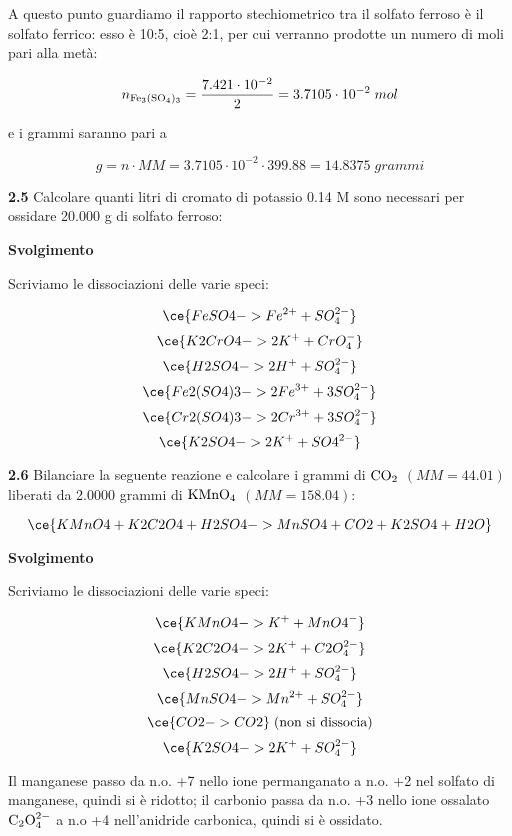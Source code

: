 A questo punto guardiamo il rapporto stechiometrico tra il solfato ferroso è il solfato ferrico: esso è 10:5, cioè 2:1, per cui verranno prodotte un numero di moli pari alla metà:

$$n_{\rm Fe_3(SO_4)_3}=\frac{7.421 \cdot 10^{-2}}{2}=3.7105 \cdot 10^{-2}\;mol$$

e i grammi saranno pari a 

$$g=n \cdot MM=3.7105 \cdot 10^{-2} \cdot 399.88=14.8375\;grammi$$

\vspace{0.2cm}\textbf{2.5} Calcolare quanti litri di cromato di potassio 0.14 M sono necessari per ossidare 20.000 g di solfato ferroso:
\begin{center}

\end{center}

\large\textbf{Svolgimento}\normalsize

\vspace{0.2cm}Scriviamo le dissociazioni delle varie speci:

$$\ce{FeSO4 -> Fe^{2+} + SO_4^{2-}}$$
$$\ce{K2CrO4 -> 2K^+ + CrO_4^-}$$
$$\ce{H2SO4 -> 2H^+ + SO_4^{2-}}$$
$$\ce{Fe2(SO4)3 -> 2Fe^{3+} + 3SO_4^{2-}}$$
$$\ce{Cr2(SO4)3 -> 2Cr^{3+} + 3SO_4^{2-}}$$
$$\ce{K2SO4 -> 2K^+ + SO4^{2-}}$$

\vspace{0.2cm}\textbf{2.6}  Bilanciare la seguente reazione e calcolare i grammi di $\rm CO_2$ $(MM=44.01)$ liberati da 2.0000 grammi di $\rm KMnO_4$ $(MM=158.04)$:


$$\ce{KMnO4 + K2C2O4 + H2SO4 -> MnSO4 + CO2 + K2SO4 + H2O}$$

\vspace{0.2cm}\large\textbf{Svolgimento}\normalsize

\vspace{0.2cm}Scriviamo le dissociazioni delle varie speci:

$$\ce{KMnO4 -> K^+ + MnO4^-}$$
$$\ce{K2C2O4 -> 2K^+ + C2O_4^{2-}}$$
$$\ce{H2SO4 -> 2H^+ + SO_4^{2-}}$$
$$\ce{MnSO4 -> Mn^{2+} + SO_4^{2-}}$$
$$\ce{CO2 -> CO2}\;\text{(non si dissocia)}$$
$$\ce{K2SO4 -> 2K^+ + SO_4^{2-}}$$

Il manganese passo da n.o. +7 nello ione permanganato a n.o. +2 nel solfato di manganese, quindi si è ridotto; il carbonio passa da n.o. +3 nello ione ossalato $\rm C_2O_4^{2-}$ a n.o +4 nell'anidride carbonica, quindi si è ossidato.

